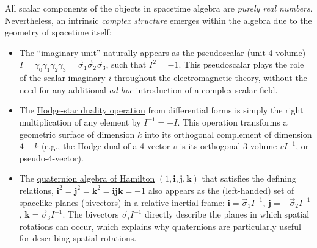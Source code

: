 \documentclass[1p,sort&compress]{elsarticle}
\numberwithin{equation}{section}
\newcommand{\rv}[1]{\vec{#1}}
\newcommand{\bv}[1]{\mathbf{#1}}
\begin{document}
All scalar components of the objects in spacetime algebra are \emph{purely real numbers}.  Nevertheless, an intrinsic \emph{complex structure} emerges within the algebra due to the geometry of spacetime itself:
\begin{itemize}
  \item The \uline{``imaginary unit''} naturally appears as the pseudoscalar (unit 4-volume) $I = \gamma_0\gamma_1\gamma_2\gamma_3 = \rv{\sigma}_1\rv{\sigma}_2\rv{\sigma}_3$, such that $I^2 = -1$.  This pseudoscalar plays the role of the scalar imaginary $i$ throughout the electromagnetic theory, without the need for any additional \emph{ad hoc} introduction of a complex scalar field.
  \item The \uline{Hodge-star duality operation} from differential forms is simply the right multiplication of any element by $I^{-1} = -I$.  This operation transforms a geometric surface of dimension $k$ into its orthogonal complement of dimension $4-k$ (e.g., the Hodge dual of a 4-vector $v$ is its orthogonal 3-volume $vI^{-1}$, or pseudo-4-vector).
  \item The \uline{quaternion algebra of Hamilton} $(1,\bv{i},\bv{j},\bv{k})$ that satisfies the defining relations, $\bv{i}^2 = \bv{j}^2 = \bv{k}^2 = \bv{i}\bv{j}\bv{k} = -1$ also appears as the (left-handed) set of spacelike planes (bivectors) in a relative inertial frame: $\bv{i} = \rv{\sigma}_1 I^{-1}$, $\bv{j} = -\rv{\sigma}_2 I^{-1}$, $\bv{k} = \rv{\sigma}_3 I^{-1}$.  The bivectors $\rv{\sigma}_i I^{-1}$ directly describe the planes in which spatial rotations can occur, which explains why quaternions are particularly useful for describing spatial rotations.
\end{itemize}
\end{document}
